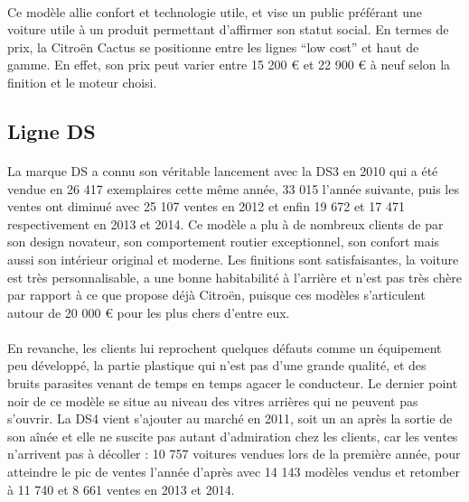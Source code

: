 \documentclass[12pt]{article}\usepackage[]{graphicx}\usepackage[]{color}
\begin{document}
\paragraph{} Ce modèle allie confort et technologie utile, et vise un public
préférant une voiture utile à un produit permettant d'affirmer son statut
social. En termes de prix, la Citroën Cactus se positionne entre les lignes ``low
cost'' et haut de gamme. En effet, son prix peut varier entre 15 200 €
et 22 900 € à neuf selon la finition et le moteur choisi\cite{banquette}.

\subsection{Ligne DS}

\paragraph{} La marque DS a connu son véritable lancement avec la DS3 en 2010 qui a
été vendue en 26 417 exemplaires cette même année, 33 015 l'année suivante,
puis les ventes ont diminué avec 25 107 ventes en 2012 et enfin 19 672 et 17 471
respectivement en 2013 et 2014. Ce modèle a plu à de nombreux clients de par
son design novateur\cite{avis}, son comportement routier exceptionnel, son
confort mais aussi son intérieur original et moderne. Les finitions sont
satisfaisantes, la voiture est très personnalisable, a une bonne habitabilité à
l'arrière et n'est pas très chère par rapport à ce que propose déjà Citroën,
puisque ces modèles s'articulent autour de 20 000 € pour les plus chers d'entre eux.

\paragraph{} En revanche, les clients lui reprochent quelques défauts comme un équipement
peu développé, la partie plastique qui n'est pas d'une grande qualité, et
des bruits parasites venant de temps en temps agacer le conducteur. Le
dernier point noir de ce modèle se situe au niveau des vitres arrières qui ne
peuvent pas s'ouvrir. La DS4 vient s'ajouter au marché en 2011, soit un an après
la sortie de son aînée et elle ne suscite pas autant d'admiration chez les
clients, car les ventes n'arrivent pas à décoller : 10 757 voitures vendues lors
de la première année, pour atteindre le pic de ventes l'année d'après avec 14
143 modèles vendus et retomber à 11 740 et 8 661 ventes en 2013 et 2014.
\end{document}
